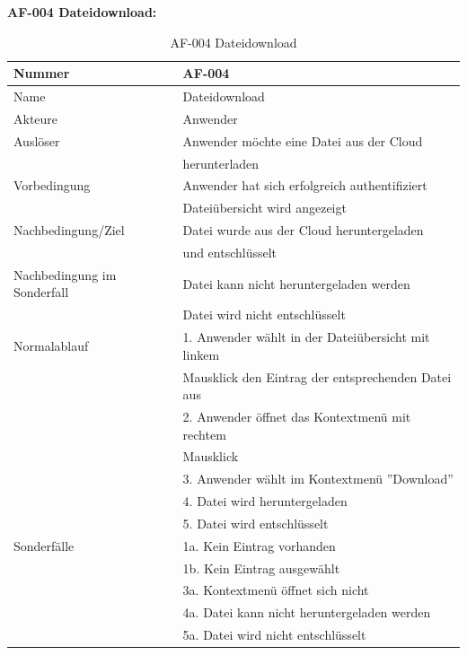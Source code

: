\documentclass[12pt,a4paper,bibliography=totocnumbered,listof=totocnumbered]{scrartcl}
\begin{document}
\textbf{AF-004 Dateidownload:}
\begin{table}[!h]
	\centering
	\begin{tabular}{|l|l|}
		\hline
		Nummer & AF-004\\
		\hline
		Name & Dateidownload\\
		\hline
		Akteure & Anwender\\
		\hline
		Auslöser & Anwender möchte eine Datei aus der Cloud \\ & herunterladen\\
		\hline
		Vorbedingung & Anwender hat sich erfolgreich authentifiziert \\ & Dateiübersicht wird angezeigt\\
		\hline
		Nachbedingung/Ziel & Datei wurde aus der Cloud heruntergeladen \\ & und entschlüsselt \\
		\hline
		Nachbedingung im Sonderfall & Datei kann nicht heruntergeladen werden \\ & Datei wird nicht entschlüsselt\\
		\hline
		Normalablauf & 1. Anwender wählt in der Dateiübersicht mit linkem \\&Mausklick den Eintrag der entsprechenden Datei aus \\ & 2. Anwender öffnet das Kontextmenü mit rechtem\\& Mausklick \\ & 3. Anwender wählt im Kontextmenü ''Download'' \\  & 4. Datei wird heruntergeladen \\ & 5. Datei wird entschlüsselt \\
		\hline
		Sonderfälle & 1a. Kein Eintrag vorhanden\\& 1b. Kein Eintrag ausgewählt\\ & 3a. Kontextmenü öffnet sich nicht \\& 4a. Datei kann nicht heruntergeladen werden \\ & 5a. Datei wird nicht entschlüsselt\\
		\hline
	\end{tabular}
	\caption{AF-004 Dateidownload}
	\label{tab:AF-004 Dateidownload}
\end{table}
\end{document}
